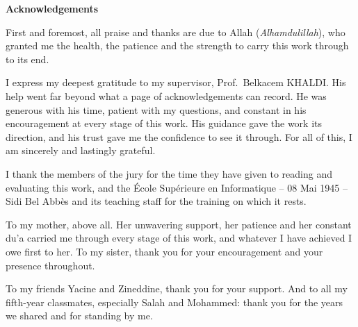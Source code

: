 \thispagestyle{empty}
\vspace*{2cm}
\begin{center}{\Huge\bfseries Acknowledgements}\end{center}
\vskip 1cm
\noindent First and foremost, all praise and thanks are due to Allah (\emph{Alhamdulillah}), who
granted me the health, the patience and the strength to carry this work through to its end.

\vspace{0.3cm}
\noindent I express my deepest gratitude to my supervisor, Prof.~Belkacem KHALDI. His help went
far beyond what a page of acknowledgements can record. He was generous with his time, patient with
my questions, and constant in his encouragement at every stage of this work. His guidance gave the
work its direction, and his trust gave me the confidence to see it through. For all of this, I am
sincerely and lastingly grateful.

\vspace{0.3cm}
\noindent I thank the members of the jury for the time they have given to reading and evaluating
this work, and the \'Ecole Sup\'erieure en Informatique -- 08 Mai 1945 -- Sidi Bel Abb\`es and its
teaching staff for the training on which it rests.

\vspace{0.3cm}
\noindent To my mother, above all. Her unwavering support, her patience and her constant du'a
carried me through every stage of this work, and whatever I have achieved I owe first to her. To my
sister, thank you for your encouragement and your presence throughout.

\vspace{0.3cm}
\noindent To my friends Yacine and Zineddine, thank you for your support. And to all my
fifth-year classmates, especially Salah and Mohammed: thank you for the years we shared and for
standing by me.

\newpage
